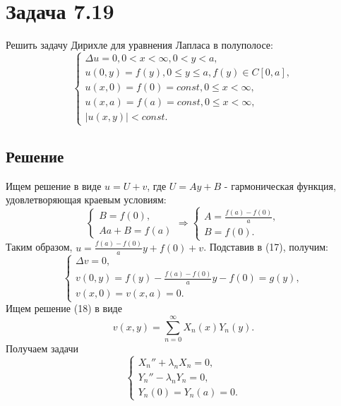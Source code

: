 \documentclass[11pt]{article}
\begin{document}
\section{Задача 7.19}
\label{sec:orgda226f8}
Решить задачу Дирихле для уравнения Лапласа в полуполосе:
\begin{equation}
\begin{cases}
\Delta u = 0, 0 < x < \infty, 0 < y < a, \\
u(0, y) = f(y), 0 \leq y \leq a, f(y) \in C[0, a], \\
u(x, 0) = f(0) = const, 0 \leq x < \infty, \\
u(x, a) = f(a) = const, 0 \leq x < \infty, \\
|u(x, y)| < const.
\end{cases}
\end{equation}
\subsection{Решение}
\label{sec:org9a170bc}
Ищем решение в виде $u = U + v$, где $U = Ay + B$ - гармоническая функция, удовлетворяющая
краевым условиям:
\begin{equation*}
\begin{cases}
B = f(0), \\
Aa + B = f(a)
\end{cases}
\Rightarrow
\begin{cases}
A = \frac{f(a) - f(0)}a, \\
B = f(0).
\end{cases}
\end{equation*}
Таким образом, $u = \frac{f(a) - f(0)}ay + f(0) + v$. Подставив в (17), получим:
\begin{equation}
\begin{cases}
\Delta v = 0, \\
v(0, y) = f(y) - \frac{f(a) - f(0)}ay - f(0) = g(y), \\
v(x, 0) = v(x, a) = 0.
\end{cases}
\end{equation}
Ищем решение (18) в виде
\begin{equation*}
v(x, y) = \sum_{n = 0}^{\infty}X_n(x)Y_n(y).
\end{equation*}
Получаем задачи
\begin{equation*}
\begin{cases}
X_n'' + \lambda_n X_n = 0, \\
Y_n'' - \lambda_n Y_n  = 0, \\
Y_n(0) = Y_n(a) = 0.
\end{cases}
\end{equation*}
\end{document}
